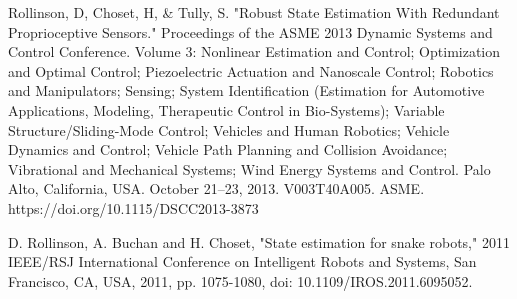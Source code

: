 \documentclass[letterpaper, 10 pt, conference]{ieeeconf}  %
\begin{document}
\begin{thebibliography}{99}
     Rollinson, D, Choset, H, \& Tully, S. "Robust State Estimation With Redundant Proprioceptive Sensors." Proceedings of the ASME 2013 Dynamic Systems and Control Conference. Volume 3: Nonlinear Estimation and Control; Optimization and Optimal Control; Piezoelectric Actuation and Nanoscale Control; Robotics and Manipulators; Sensing; System Identification (Estimation for Automotive Applications, Modeling, Therapeutic Control in Bio-Systems); Variable Structure/Sliding-Mode Control; Vehicles and Human Robotics; Vehicle Dynamics and Control; Vehicle Path Planning and Collision Avoidance; Vibrational and Mechanical Systems; Wind Energy Systems and Control. Palo Alto, California, USA. October 21–23, 2013. V003T40A005. ASME. https://doi.org/10.1115/DSCC2013-3873

     D. Rollinson, A. Buchan and H. Choset, "State estimation for snake robots," 2011 IEEE/RSJ International Conference on Intelligent Robots and Systems, San Francisco, CA, USA, 2011, pp. 1075-1080, doi: 10.1109/IROS.2011.6095052.
\end{thebibliography}
\end{document}
